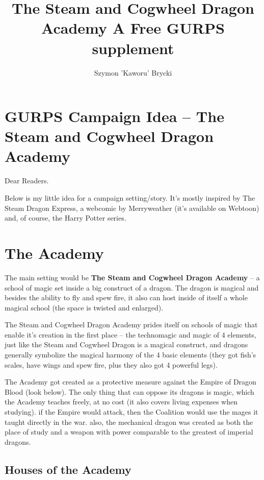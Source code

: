 \documentclass[a4paper,11pt]{article}
\title{The Steam and Cogwheel Dragon Academy \break A Free GURPS supplement}
\author{Szymon 'Kaworu' Brycki}
\begin{document}
\maketitle

\newpage

\tableofcontents

\newpage

\section{GURPS Campaign Idea – The Steam and Cogwheel Dragon Academy}

Dear Readers.

Below is my little idea for a campaign setting/story. It’s mostly inspired by The Steam Dragon Express, a webcomic by Merryweather (it’s available on Webtoon) and, of course, the Harry Potter series.

\newpage

\section{The Academy} 

The main setting would be \textbf{The Steam and Cogwheel Dragon Academy} – a school of magic set inside a big construct of a dragon. The dragon is magical and besides the ability to fly and spew fire, it also can host inside of itself a whole magical school (the space is twisted and enlarged).

The Steam and Cogwheel Dragon Academy prides itself on schools of magic that enable it’s creation in the first place – the technomagic and magic of 4 elements, just like the Steam and Cogwheel Dragon is a magical construct, and dragons generally symbolize the magical harmony of the 4 basic elements (they got fish’s scales, have wings and spew fire, plus they also got 4 powerful legs).

The Academy got created as a protective measure against the Empire of Dragon Blood (look below). The only thing that can oppose its dragons is magic, which the Academy teaches freely, at no cost (it also covers living expenses when studying). if the Empire would attack, then the Coalition would use the mages it taught directly in the war. also, the mechanical dragon was created as both the place of study and a weapon with power comparable to the greatest of imperial dragons. 

\subsection{Houses of the Academy}
\end{document}
